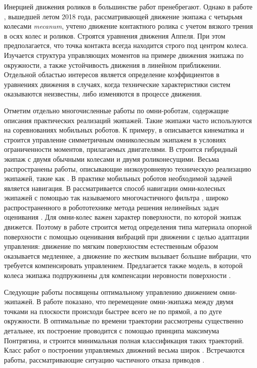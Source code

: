 Инерцией движения роликов в большинстве работ  пренебрегают. Однако в работе \cite{Adamov2018}, вышедшей летом 2018 года, рассматривающей движение экипажа с четырьмя колесами \textit{mecanum}, учтено движение контактного ролика с учетом вязкого трения в осях колес и роликов. Строятся уравнения движения Аппеля. При этом предполагается, что точка контакта всегда находится строго под центром колеса. Изучается структура управляющих моментов на примере движения экипажа по окружности, а также устойчивость движения в линейном приближении. Отдельной областью интересов является определение коэффициентов в уравнениях движения \cite{Adamov2018a} в случаях, когда технические характеристики систем оказываются неизвестны, либо изменяются в процессе движения.

Отметим отдельно многочисленные работы по омни-роботам, содержащие описания практических реализаций  экипажей. Такие экипажи часто используются на соревнованиях мобильных роботов. К примеру, в \cite{Indiveri2007} описывается кинематика и строится управление симметричным омниколесным экипажем в условиях ограниченности моментов, прилагаемых двигателями. В \cite{Wada2007} строится гибридный экипаж с двумя обычными колесами и двумя роликонесущими. Весьма распространены работы, описывающие  низкоуровневую техническую реализацию экипажей, такие как \cite{Mohamed2017,Krishnaraj2017,SalamAl-Ammri2010}. В практике мобильных роботов необходимой задачей является навигация. В \cite{Eng2010} рассматривается способ навигации омни-колесных экипажей с помощью так называемого многочастичного фильтра \cite{Gordon1993}, широко распространенного в робототехнике метода решения нелинейных задач оценивания \cite{DelMoral1997}. Для омни-колес важен характер поверхности, по которой экипаж движется. Поэтому в работе \cite{Vicente2015} строится метод определения типа материала опорной поверхности с помощью оценивания вибраций при движении с целью адаптации управления: движение по мягким поверхностям естественным образом оказывается медленнее, а движение по жестким вызывает б\textit{о}льшие вибрации, что требуется компенсировать управлением. Предлагается также модель, в которой колеса экипажа подпружинены для компенсации неровности поверхности \cite{NguenMAI2012}.

Следующие работы посвящены оптимальному управлению движением омни-экипажей.
В работе \cite{Ashmore2002a} показано, что перемещение омни-экипажа между двумя точками на плоскости происходи быстрее всего не по прямой, а по дуге окружности. В \cite{Balkcom2006} оптимальные по времени траектории рассмотрены существенно детальнее, их построение проводится с помощью принципа максимума Понтрягина, и строится минимальная полная классификация таких траекторий. Класс работ о построении управляемых движений весьма широк \cite{Huang2015,Bramanta2017,Kalmar-Nagy2016,Szayer2017}. Встречаются работы, рассматривающие ситуацию частичного отказа приводов \cite{Field2017,Ivanov2015a}.

